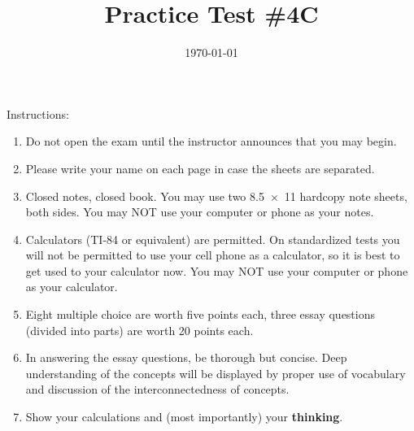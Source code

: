 \documentclass[exam,addpoints, noanswers]{exam}
\title{Practice Test \#4C}
\date{\today}
\author{\mobeardInstructorShort}
\begin{document}
\maketitle
\vfill
\mobeardExamNameBlock
\vfill
Instructions: 
\begin{enumerate}
\item Do not open the exam until the instructor announces that you may begin.
\item Please write your name on each page in case the sheets are separated. 
\item Closed notes, closed book.  You may use two \SI{8.5x11}{\inch} hardcopy note sheets, both sides. You may NOT use your computer or phone as your notes. 
\item Calculators (TI-84 or equivalent) are permitted.  On standardized tests you will not be permitted to use your cell phone as a calculator, so it is best to get used to your calculator now. You may NOT use your computer or phone as your calculator. 
\item Eight multiple choice are worth five points each, three essay questions (divided into parts) are worth 20 points each. 
\item In answering the essay questions, be thorough but concise. Deep understanding of the concepts will be displayed by proper use of vocabulary and discussion of the interconnectedness of concepts. 
\item Show your calculations and (most importantly) your \textbf{thinking}.
\end{enumerate}
\vfill
\begin{center}
\gradetable[h][questions]
\end{center}
\clearpage
\end{document}
